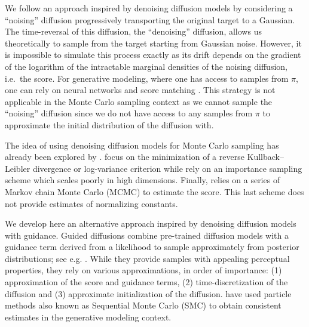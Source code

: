 \documentclass{article}
\theoremstyle{plain}
\theoremstyle{definition}
\theoremstyle{remark}
\begin{document}
We follow an approach inspired by denoising diffusion models \citep{ho2020denoising,song2020score,song2019generative} by considering a ``noising'' diffusion progressively transporting the original target to a Gaussian. The time-reversal of this diffusion, the ``denoising'' diffusion, allows us theoretically to sample from the target starting from Gaussian noise. However, it is impossible to simulate this process exactly as its drift depends on the gradient of the logarithm of the intractable marginal densities of the noising diffusion, i.e.\ the score. For generative modeling, where one has access to samples from \(\pi\), one can rely on neural networks and score matching \cite{Hyvarinen:2005a,vincent2011connection}. This strategy is not applicable in the Monte Carlo sampling context as we cannot sample the ``noising'' diffusion since we do not have access to any samples from \(\pi\) to approximate the initial distribution of the diffusion with. %

The idea of using denoising diffusion models for Monte Carlo sampling has already been explored by \citet{berner2022optimal,mcdonald2022proposal,vargasDDSampler2023,huang2023monte,richter2023improved,zhang2023diffusion}. \citet{berner2022optimal, richter2023improved,vargasDDSampler2023} focus on the minimization of a reverse Kullback--Leibler divergence or log-variance criterion while \citet{mcdonald2022proposal} rely on an importance sampling scheme which scales poorly in high dimensions. Finally, \citet{huang2023monte} relies on a series of Markov chain Monte Carlo (MCMC) to estimate the score. This last scheme does not provide estimates of normalizing constants.

We develop here an alternative approach inspired by denoising diffusion models with guidance. Guided diffusions combine pre-trained diffusion models with a guidance term derived from a likelihood to sample approximately from posterior distributions; see e.g. \citet{song2020score,chung2023diffusion,song2023pseudoinverseguided,corso2023particle}. While they provide samples with appealing perceptual properties, they rely on various approximations, in order of importance: (1) approximation of the score and guidance terms, (2) time-discretization of the diffusion and (3) approximate initialization of the diffusion. \citet{wu2023practical2023,cardoso2023diffusion} have used particle methods also known as Sequential Monte Carlo (SMC) \citep{Doucet:2001,chopin2020book} to obtain consistent estimates in the generative modeling context.
\end{document}
